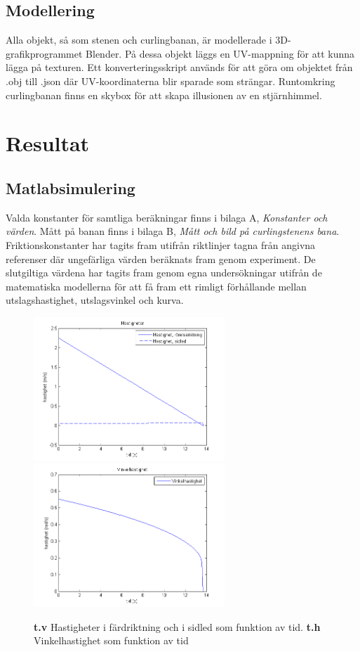 \documentclass[11pt]{article} %
\begin{document}
\subsection{Modellering}
Alla objekt, så som stenen och curlingbanan, är modellerade i 3D-grafikprogrammet Blender. På dessa objekt läggs en UV-mappning för att kunna lägga på texturen. Ett konverteringsskript används för att göra om objektet från .obj till .json där UV-koordinaterna blir sparade som strängar. Runtomkring curlingbanan finns en skybox för att skapa illusionen av en stjärnhimmel.

\pagebreak

\section{Resultat}
\subsection{Matlabsimulering}
Valda konstanter för samtliga beräkningar finns i bilaga A, \emph{Konstanter och värden}. Mått på banan finns i bilaga B, \emph{Mått och bild på curlingstenens bana}. Friktionskonstanter har tagits fram utifrån riktlinjer tagna från angivna referenser där ungefärliga värden beräknats fram genom experiment. De slutgiltiga värdena har tagits fram genom egna undersökningar utifrån de matematiska modellerna för att få fram ett rimligt förhållande mellan utslagshastighet, utslagsvinkel och kurva.   


\begin{figure}[ht!]
\centering
\includegraphics[width=72mm]{hastigheter_tid_graf.png}
\includegraphics[width=72mm]{vinkelhastighet_tid_graf.png}
\caption{\textbf{t.v} Hastigheter i färdriktning och i sidled som funktion av tid. \textbf{t.h} Vinkelhastighet som funktion av tid}
\label{fig:hast_and_vinkel_graf}
\label{overflow}
\end{figure}
\end{document}
